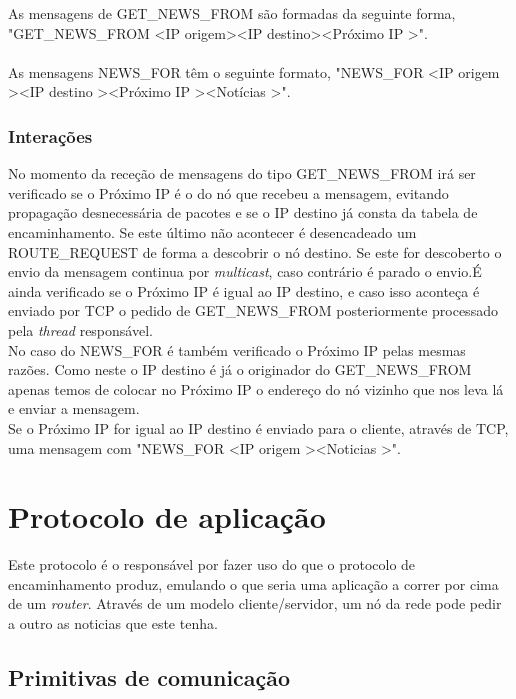 \documentclass{llncs}
\begin{document}
As mensagens de GET\_NEWS\_FROM são formadas da seguinte forma, "GET\_NEWS\_FROM \textless IP origem\textgreater \textless IP destino\textgreater \textless Próximo IP \textgreater".\\
\\
As mensagens NEWS\_FOR têm o seguinte formato, "NEWS\_FOR \textless IP origem \textgreater \textless IP destino \textgreater \textless Próximo IP \textgreater \textless Notícias \textgreater".

\subsubsection{Interações}

No momento da receção de mensagens do tipo GET\_NEWS\_FROM irá ser verificado se o Próximo IP é o do nó que recebeu a mensagem, evitando propagação desnecessária de pacotes e se o IP destino já consta da tabela de encaminhamento. Se este último não acontecer é desencadeado um ROUTE\_REQUEST de forma a descobrir o nó destino. Se este for descoberto o envio da mensagem continua por \emph{multicast}, caso contrário é parado o envio.É ainda verificado se o Próximo IP é igual ao IP destino, e caso isso aconteça é enviado por TCP o pedido de GET\_NEWS\_FROM posteriormente processado pela \emph{thread} responsável.\\
No caso do NEWS\_FOR é também verificado o Próximo IP pelas mesmas razões. Como neste o IP destino é já o originador do GET\_NEWS\_FROM apenas temos de colocar no Próximo IP o endereço do nó vizinho que nos leva lá e enviar a mensagem.\\
Se o Próximo IP for igual ao IP destino é enviado para o cliente, através de TCP, uma mensagem com "NEWS\_FOR \textless IP origem \textgreater \textless Noticias \textgreater".

\section{Protocolo de aplicação}

Este protocolo é o responsável por fazer uso do que o protocolo de encaminhamento produz, emulando o que seria uma aplicação a correr por cima de um \emph{router}. Através de um modelo cliente/servidor, um nó da rede pode pedir a outro as noticias que este tenha.

\subsection{Primitivas de comunicação}
\end{document}
